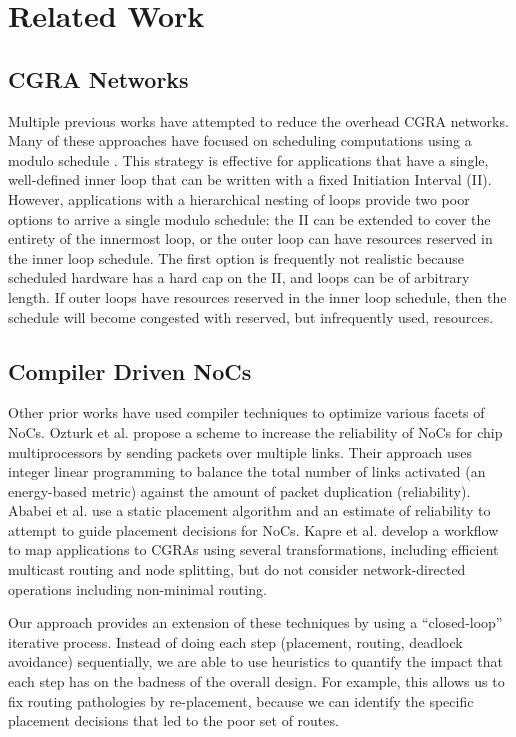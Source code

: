 \section{Related Work}
\label{sec:related}
\subsection{CGRA Networks}
Multiple previous works have attempted to reduce the overhead CGRA networks. 
Many of these approaches have focused on scheduling computations using a modulo schedule \cite{van2009static, dimitroulakos2006exploring, wave}.
This strategy is effective for applications that have a single, well-defined inner loop that can be written with a fixed Initiation Interval (II).
However, applications with a hierarchical nesting of loops provide two poor options to arrive a single modulo schedule: the II can be extended to cover the entirety of the innermost loop, or the outer loop can have resources reserved in the inner loop schedule. 
The first option is frequently not realistic because scheduled hardware has a hard cap on the II, and loops can be of arbitrary length.
If outer loops have resources reserved in the inner loop schedule, then the schedule will become congested with reserved, but infrequently used, resources. 
\subsection{Compiler Driven NoCs}
Other prior works have used compiler techniques to optimize various facets of NoCs.
Ozturk et al. \cite{ozturk2010compiler} propose a scheme to increase the reliability of NoCs for chip multiprocessors by sending packets over multiple links. 
Their approach uses integer linear programming to balance the total number of links activated (an energy-based metric) against the amount of packet duplication (reliability).
Ababei et al. \cite{ababei2011energy} use a static placement algorithm and an estimate of reliability to attempt to guide placement decisions for NoCs.
Kapre et al. \cite{kapre2011noc} develop a workflow to map applications to CGRAs using several transformations, including efficient multicast routing and node splitting, but do not consider network-directed operations including non-minimal routing.

Our approach provides an extension of these techniques by using a ``closed-loop'' iterative process. 
Instead of doing each step (placement, routing, deadlock avoidance) sequentially, we are able to use heuristics to quantify the impact that each step has on the badness of the overall design.
For example, this allows us to fix routing pathologies by re-placement, because we can identify the specific placement decisions that led to the poor set of routes.
